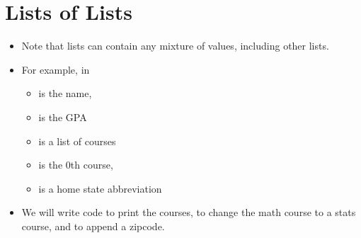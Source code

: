 \documentclass[letterpaper,10pt,english]{sphinxmanual}
\begin{document}
\section{Lists of Lists}
\label{\detokenize{lecture_notes/lec08_lists1:lists-of-lists}}\begin{itemize}
\item {} 
Note that lists can contain any mixture of values, including other lists.

\item {} 
For example, in

%
\begin{sphinxVerbatim}[commandchars=\\\{\}]
  \PYG{p}{[}   \PYG{p}{[}   \PYG{p}{]}  \PYG{p}{]}
\end{sphinxVerbatim}
\begin{itemize}
\item {} 
 is the name,

\item {} 
 is the GPA

\item {} 
 is a list of courses

\item {} 
 is the 0th course, 

\item {} 
 is a home state abbreviation

\end{itemize}

\item {} 
We will write code to print the courses, to change the math course to
a stats course, and to append a zipcode.

\end{itemize}
\end{document}
